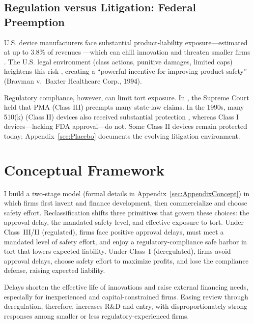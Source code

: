 \documentclass[letterpaper,12pt]{article}
\theoremstyle{definition}
\begin{document}
\subsection{Regulation versus Litigation: Federal Preemption}

U.S. device manufacturers face substantial product-liability exposure---estimated at up to 3.8\% of revenues \citep{MckinseyCostSafety:2018}---which can chill innovation and threaten smaller firms \citep{Galasso:2018}. The U.S. legal environment (class actions, punitive damages, limited caps) heightens this risk \citep{Guendling2016}, creating a “powerful incentive for improving product safety” (Bravman v.\ Baxter Healthcare Corp., 1994).\footnotemark {}


Regulatory compliance, however, can limit tort exposure. In , the Supreme Court held that PMA (Class III) preempts many state-law claims. In the 1990s, many 510(k) (Class II) devices also received substantial protection \citep{flaherty2008defending}, whereas Class I devices---lacking FDA approval---do not. Some Class II devices remain protected today; Appendix~\ref{sec:Placebo} documents the evolving litigation environment.




\section{Conceptual Framework}\label{sec:Concept}

I build a two-stage model (formal details in Appendix~\ref{sec:AppendixConcept}) in which firms first invent and finance development, then commercialize and choose safety effort. Reclassification shifts three primitives that govern these choices: the approval delay, the mandated safety level, and effective exposure to tort. Under Class~III/II (regulated), firms face positive approval delays, must meet a mandated level of safety effort, and enjoy a regulatory-compliance safe harbor in tort that lowers expected liability. Under Class~I (deregulated), firms avoid approval delays, choose safety effort to maximize profits, and lose the compliance defense, raising expected liability.


Delays shorten the effective life of innovations and raise external financing needs, especially for inexperienced and capital-constrained firms. Easing review through deregulation, therefore, increases R\&D and entry, with disproportionately strong responses among smaller or less regulatory-experienced firms.
\end{document}
